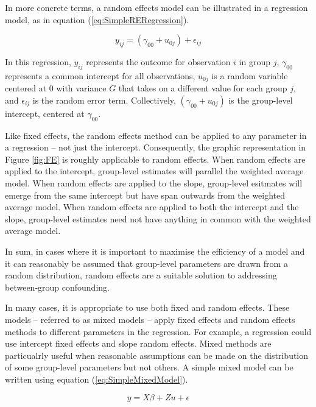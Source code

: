 \documentclass[12pt]{article}
\begin{document}
In more concrete terms, a random effects model can be illustrated in a regression model, as in equation (\ref{eq:SimpleRERegression}).

\begin{equation}\label{eq:SimpleRERegression}
  y_{ij} = (\gamma_{00} + u_{0j}) + \epsilon_{ij}
\end{equation}

In this regression, $y_{ij}$ represents the outcome for observation $i$ in group $j$, $\gamma_{00}$ represents a common intercept for all observations, $u_{0j}$ is a random variable centered at $0$ with variance $G$ that takes on a different value for each group $j$, and $\epsilon_{ij}$ is the random error term. Collectively, $(\gamma_{00} + u_{0j})$ is the group-level intercept, centered at $\gamma_{00}$.

Like fixed effects, the random effects method can be applied to any parameter in a regression -- not just the intercept. Consequently, the graphic representation in Figure \ref{fig:FE} is roughly applicable to random effects. When random effects are applied to the intercept, group-level estimates will parallel the weighted average model. When random effects are applied to the slope, group-level esitmates will emerge from the same intercept but have span outwards from the weighted average model. When random effects are applied to both the intercept and the slope, group-level estimates need not have anything in common with the weighted average model.

In sum, in cases where it is important to maximise the efficiency of a model and it can reasonably be assumed that group-level parameters are drawn from a random distribution, random effects are a suitable solution to addressing between-group confounding.

In many cases, it is appropriate to use both fixed and random effects. These models -- referred to as mixed models -- apply fixed effects and random effects methods to different parameters in the regression. For example, a regression could use intercept fixed effects and slope random effects. Mixed methods are particualrly useful when reasonable assumptions can be made on the distribution of some group-level parameters but not others. A simple mixed model can be written using equation (\ref{eq:SimpleMixedModel}).

\begin{equation}\label{eq:SimpleMixedModel}
  y = X\beta + Zu + \epsilon
\end{equation}
\end{document}
